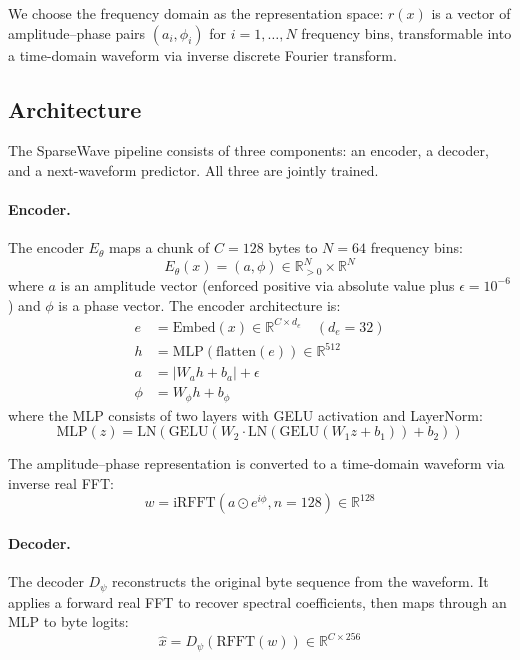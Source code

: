 \documentclass[10pt,twocolumn]{article}
\begin{document}
We choose the frequency domain as the representation space: $r(x)$ is a vector of amplitude--phase pairs $(a_i, \phi_i)$ for $i = 1, \ldots, N$ frequency bins, transformable into a time-domain waveform via inverse discrete Fourier transform.

\subsection{Architecture}

The SparseWave pipeline consists of three components: an encoder, a decoder, and a next-waveform predictor. All three are jointly trained.

\paragraph{Encoder.} The encoder $E_\theta$ maps a chunk of $C = 128$ bytes to $N = 64$ frequency bins:
\begin{equation}
    E_\theta(x) = (a, \phi) \in \mathbb{R}^N_{>0} \times \mathbb{R}^N
\end{equation}
where $a$ is an amplitude vector (enforced positive via absolute value plus $\epsilon = 10^{-6}$) and $\phi$ is a phase vector. The encoder architecture is:
\begin{align}
    e &= \text{Embed}(x) \in \mathbb{R}^{C \times d_e} \quad (d_e = 32) \\
    h &= \text{MLP}(\text{flatten}(e)) \in \mathbb{R}^{512} \\
    a &= |W_a h + b_a| + \epsilon \\
    \phi &= W_\phi h + b_\phi
\end{align}
where the MLP consists of two layers with GELU activation and LayerNorm:
\begin{equation}
    \text{MLP}(z) = \text{LN}(\text{GELU}(W_2 \cdot \text{LN}(\text{GELU}(W_1 z + b_1)) + b_2))
\end{equation}

The amplitude--phase representation is converted to a time-domain waveform via inverse real FFT:
\begin{equation}
    w = \text{iRFFT}(a \odot e^{i\phi}, n = 128) \in \mathbb{R}^{128}
\end{equation}

\paragraph{Decoder.} The decoder $D_\psi$ reconstructs the original byte sequence from the waveform. It applies a forward real FFT to recover spectral coefficients, then maps through an MLP to byte logits:
\begin{equation}
    \hat{x} = D_\psi(\text{RFFT}(w)) \in \mathbb{R}^{C \times 256}
\end{equation}
\end{document}
